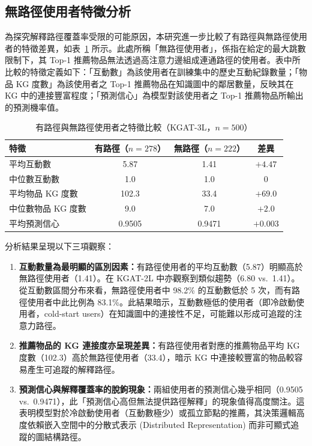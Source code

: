 \subsection{無路徑使用者特徵分析}

為探究解釋路徑覆蓋率受限的可能原因，本研究進一步比較了有路徑與無路徑使用者的特徵差異，如表~\ref{tab:no_path_analysis} 所示。此處所稱「無路徑使用者」，係指在給定的最大跳數限制下，其 Top-1 推薦物品無法透過高注意力邊組成連通路徑的使用者。表中所比較的特徵定義如下：「互動數」為該使用者在訓練集中的歷史互動紀錄數量；「物品 KG 度數」為該使用者之 Top-1 推薦物品在知識圖中的鄰居數量，反映其在 KG 中的連接豐富程度；「預測信心」為模型對該使用者之 Top-1 推薦物品所輸出的預測機率值。

\begin{table}[htbp]
  \centering
  \caption{有路徑與無路徑使用者之特徵比較（KGAT-3L，$n = 500$）}
  \label{tab:no_path_analysis}
  \begin{tabular}{lccc}
    \toprule
    特徵 & 有路徑（$n{=}278$） & 無路徑（$n{=}222$） & 差異 \\
    \midrule
    平均互動數 & 5.87 & 1.41 & $+4.47$ \\
    中位數互動數 & 1.0 & 1.0 & $0$ \\
    平均物品 KG 度數 & 102.3 & 33.4 & $+69.0$ \\
    中位數物品 KG 度數 & 9.0 & 7.0 & $+2.0$ \\
    平均預測信心 & 0.9505 & 0.9471 & $+0.003$ \\
    \bottomrule
  \end{tabular}
\end{table}

分析結果呈現以下三項觀察：

\begin{enumerate}[leftmargin=2em]
  \item \textbf{互動數量為最明顯的區別因素：}有路徑使用者的平均互動數（5.87）明顯高於無路徑使用者（1.41）。在 KGAT-2L 中亦觀察到類似趨勢（6.80 vs.\ 1.41）。從互動數區間分布來看，無路徑使用者中 98.2\% 的互動數低於 5 次，而有路徑使用者中此比例為 83.1\%。此結果暗示，互動數極低的使用者（即冷啟動使用者，cold-start users）在知識圖中的連接性不足，可能難以形成可追蹤的注意力路徑。
  \item \textbf{推薦物品的 KG 連接度亦呈現差異：}有路徑使用者對應的推薦物品平均 KG 度數（102.3）高於無路徑使用者（33.4），暗示 KG 中連接較豐富的物品較容易產生可追蹤的解釋路徑。
  \item \textbf{預測信心與解釋覆蓋率的脫鉤現象：}兩組使用者的預測信心幾乎相同（0.9505 vs.\ 0.9471），此「預測信心高但無法提供路徑解釋」的現象值得高度關注。這表明模型對於冷啟動使用者（互動數極少）或孤立節點的推薦，其決策邏輯高度依賴嵌入空間中的分散式表示 (Distributed Representation) 而非可顯式追蹤的圖結構路徑。
\end{enumerate}

